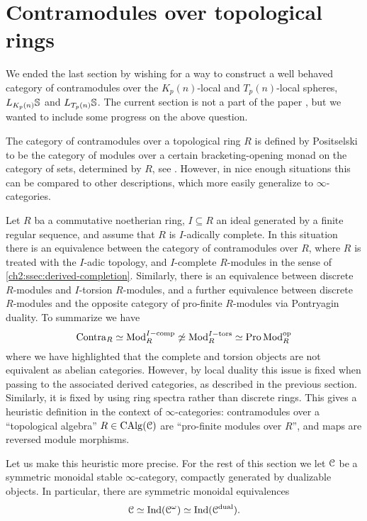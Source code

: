 
\section{Contramodules over topological rings}
\label{ch2:addendum}

We ended the last section by wishing for a way to construct a well behaved category of contramodules over the $K_p(n)$-local and $T_p(n)$-local spheres, $L_\Kpn\S$ and $L_{T_p(n)}\S$. The current section is not a part of the paper \cite{aambo_2024_positselski}, but we wanted to include some progress on the above question. 

The category of contramodules over a topological ring $R$ is defined by Positselski to be the category of modules over a certain bracketing-opening monad on the category of sets, determined by $R$, see \cite{positselski_2022_contramodules}. However, in nice enough situations this can be compared to other descriptions, which more easily generalize to $\infty$-categories. 

\begin{remark}
    \label{ch2:rm:contra-as-op-pro-modules}
    Let $R$ ba a commutative noetherian ring, $I\subseteq R$ an ideal generated by a finite regular sequence, and assume that $R$ is $I$-adically complete. In this situation there is an equivalence between the category of contramodules over $R$, where $R$ is treated with the $I$-adic topology, and $I$-complete $R$-modules in the sense of \cref{ch2:ssec:derived-completion}. Similarly, there is an equivalence between discrete $R$-modules and $I$-torsion $R$-modules, and a further equivalence between discrete $R$-modules and the opposite category of pro-finite $R$-modules via Pontryagin duality. To summarize we have  
    \[\Contra_R \simeq \Mod_R\Icomp \not\simeq \Mod_R\Itors\simeq \Pro\Mod_R\op\]
    where we have highlighted that the complete and torsion objects are not equivalent as abelian categories. However, by local duality this issue is fixed when passing to the associated derived categories, as described in the previous section. Similarly, it is fixed by using ring spectra rather than discrete rings. This gives a heuristic definition in the context of $\infty$-categories: contramodules over a ``topological algebra'' $R\in \CAlg(\C)$ are ``pro-finite modules over $R$'', and maps are reversed module morphisms.  
\end{remark}

Let us make this heuristic more precise. For the rest of this section we let $\C$ be a symmetric monoidal stable $\infty$-category, compactly generated by dualizable objects. In particular, there are symmetric monoidal equivalences 
\[\C \simeq \Ind(\C^\omega) \simeq \Ind(\C\dual).\]

